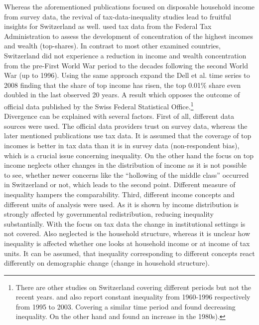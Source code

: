 \documentclass[twoside]{article}\usepackage[]{graphicx}\usepackage[]{color}
\begin{document}
\begin{multicols}{2}
Whereas the aforementioned publications focused on disposable household income from survey data, the revival of tax-data-inequality studies lead to fruitful insights for Switzerland as well. \citet{dell_income_2007} used tax data from the Federal Tax Administration to assess the development of concentration of the highest incomes and wealth (top-shares). In contrast to most other examined countries, Switzerland did not experience a reduction in income and wealth concentration from the pre-First World War period to the decades following the second World War (up to 1996). Using the same approach \citet{foellmi_volatile_2013} expand the Dell et al. time series to 2008 finding that the share of top income has risen, the top 0.01\% share even doubled in the last observed 20 years. A result which opposes the outcome of official data published by the Swiss Federal Statistical Office.\footnote{There are other studies on Switzerland covering different periods but not the recent years. \citet{Flückiger et al. (2007) FEHLT} and also \citet{jeitziner_regionale_2007, jeitziner_regionale_2009} report constant inequality from 1960-1996 respectively from 1995 to 2003. Covering a similar time period \citet{bauer_verteilung_1994} and \citet{Bolzani and Abul Naga 2002 FEHLT oder es ist 2001} found decreasing inequality. On the other hand \citet{Buchmann and Sacchi (1995) FEHLT oder incomplete, siehe buchmann_zur_????} and \citet{Ernst et al. 2009 FEHLT} found an increase in the 1980s).} \\


Divergence can be explained with several factors. First of all, different data sources were used. The official data providers trust on survey data, whereas the later mentioned publications use tax data. It is assumed that the coverage of top incomes is better in tax data than it is in survey data (non-respondent bias), which is a crucial issue concerning inequality. On the other hand the focus on top income neglects other changes in the distribution of income as it is not possible to see, whether newer concerns like the ``hollowing of the middle class'' occurred in Switzerland or not, which leads to the second point. Different measure of inequality hampers the comparability. Third, different income concepts and different units of analysis were used. As it is shown by \citet{modetta_einkommensungleichheit_2012} income distribution is strongly affected by governmental redistribution, reducing inequality substantially. With the focus on tax data the change in institutional settings is not covered. Also neglected is the household structure, whereas it is unclear how inequality is affected whether one looks at household income or at income of tax units. It can be assumed, that inequality corresponding to different concepts react differently on demographic change (change in household structure). 


\end{multicols}
\end{document}
